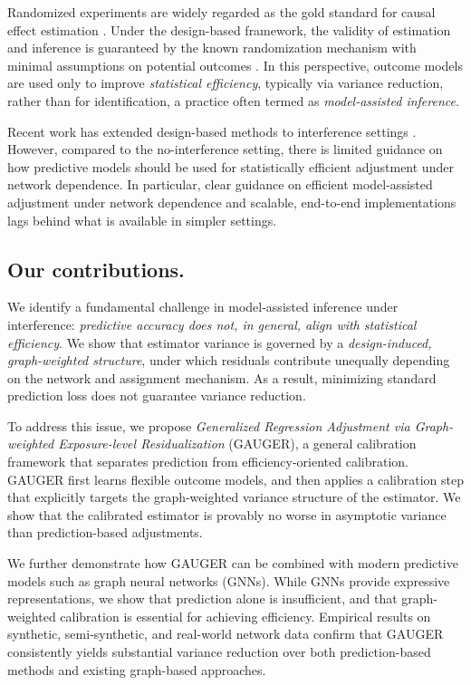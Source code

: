 \documentclass[twoside,letterpaper]{article}
\theoremstyle{plain}
\theoremstyle{definition}
\theoremstyle{remark}
\begin{document}
Randomized experiments are widely regarded as the gold standard for causal effect estimation \citep{hinkelmann2007design, imbens2015causal}. Under the design-based framework, the validity of estimation and inference is guaranteed by the known randomization mechanism with minimal assumptions on potential outcomes \citep{neyman1923application, rubin2005causal, ding2024first}. In this perspective, outcome models are used only to improve \emph{statistical efficiency}, typically via variance reduction, rather than for identification, a practice often termed as \emph{model-assisted inference}.

Recent work has extended design-based methods to interference settings \citep{hudgens2008toward, aronow2017estimating, basse2018analyzing, chang2023design, leung2022causal, gao2023causal}. However, compared to the no-interference setting, there is limited guidance on how predictive models should be used for statistically efficient adjustment under network dependence. In particular, clear guidance on efficient model-assisted adjustment under network dependence and scalable, end-to-end implementations lags behind what is available in simpler settings.

\subsection{Our contributions.}
We identify a fundamental challenge in model-assisted inference under interference: \emph{predictive accuracy does not, in general, align with statistical efficiency}. We show that estimator variance is governed by a \emph{design-induced, graph-weighted structure}, under which residuals contribute unequally depending on the network and assignment mechanism. As a result, minimizing standard prediction loss does not guarantee variance reduction.

To address this issue, we propose \emph{Generalized Regression Adjustment via Graph-weighted Exposure-level Residualization} (GAUGER), a general calibration framework that separates prediction from efficiency-oriented calibration. GAUGER first learns flexible outcome models, and then applies a calibration step that explicitly targets the graph-weighted variance structure of the estimator. We show that the calibrated estimator is provably no worse in asymptotic variance than prediction-based adjustments.

We further demonstrate how GAUGER can be combined with modern predictive models such as graph neural networks (GNNs). While GNNs provide expressive representations, we show that prediction alone is insufficient, and that graph-weighted calibration is essential for achieving efficiency. Empirical results on synthetic, semi-synthetic, and real-world network data confirm that GAUGER consistently yields substantial variance reduction over both prediction-based methods and existing graph-based approaches.
\end{document}
